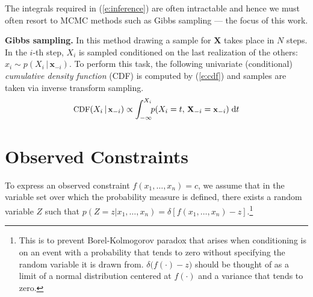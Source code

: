 \documentclass[letterpaper]{article}
\newcommand{\bvec}[1]{\textbf{#1}}
\newcommand{\pr}{p}
\newcommand{\dd}{\;\mathrm{d}} %
\begin{document}
The integrals required in 
(\ref{e:inference}) 
are often intractable and hence we must often resort to MCMC methods
such as Gibbs sampling \cite{geman1984stochastic} --- the focus of this work.

\noindent
{\bf Gibbs sampling.}
 In this method drawing a sample for $\bvec{X}$ takes place in $N$ steps.
In the $i$-th step, $X_i$ is sampled conditioned on the last realization of the others:
$x_i \sim \pr(X_i \,|\, \bvec{x}_{-i})$. 
To perform this task, the following univariate (conditional) \emph{cumulative density function} (CDF)
is computed by (\ref{e:cdf}) and samples are taken via inverse transform sampling. 
\begin{equation} \footnotesize
\label{e:cdf}
\text{CDF}(X_i  \,|\, \bvec{x}_{-i}) 
\propto
\int_{-\infty}^{X_i} \!\! \pr(X_i = t, \,\bvec{X}_{-i} = \bvec{x}_{-i})  \dd  t
\end{equation} 



\section{Observed Constraints}\label{sect:determinism}

To express an observed constraint $f(x_1, \ldots, x_n) = c$, we assume that
in the variable set over which the probability measure is defined, there exists 
a random variable $Z$ such that $\pr(Z=z | x_1, \ldots, x_n) = \delta[f(x_1, \ldots, x_n) - z]$.\footnote{
This is to prevent Borel-Kolmogorov paradox \cite{kolmogorov1950foundations}
that arises when conditioning is on an event with a probability that tends to zero 
without specifying the random variable it is drawn from. %
$\delta\big( f(\cdot) - z\big)$ should be thought of as a limit of a normal distribution centered at $f(\cdot)$ and a variance that tends to zero.
} 
\end{document}
